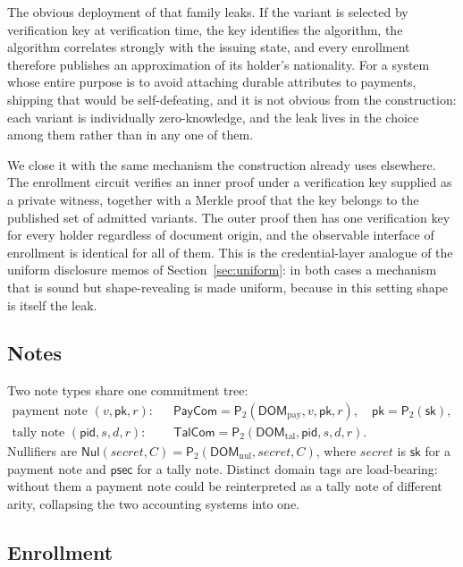 \documentclass[11pt,a4paper]{article}
\theoremstyle{definition}
\theoremstyle{plain}
\theoremstyle{remark}
\newcommand{\pid}{\ensuremath{\mathsf{pid}}}
\newcommand{\psec}{\ensuremath{\mathsf{psec}}}
\newcommand{\Pcom}{\ensuremath{\mathsf{PayCom}}}
\newcommand{\Tcom}{\ensuremath{\mathsf{TalCom}}}
\newcommand{\Nul}{\ensuremath{\mathsf{Nul}}}
\newcommand{\PT}{\ensuremath{\mathsf{P}_2}}
\begin{document}
The obvious deployment of that family leaks. If the variant is selected by verification key at verification time, the key identifies the algorithm, the algorithm correlates strongly with the issuing state, and every enrollment therefore publishes an approximation of its holder's nationality. For a system whose entire purpose is to avoid attaching durable attributes to payments, shipping that would be self-defeating, and it is not obvious from the construction: each variant is individually zero-knowledge, and the leak lives in the choice among them rather than in any one of them.

We close it with the same mechanism the construction already uses elsewhere. The enrollment circuit verifies an inner proof under a verification key supplied as a private witness, together with a Merkle proof that the key belongs to the published set of admitted variants. The outer proof then has one verification key for every holder regardless of document origin, and the observable interface of enrollment is identical for all of them. This is the credential-layer analogue of the uniform disclosure memos of Section~\ref{sec:uniform}: in both cases a mechanism that is sound but shape-revealing is made uniform, because in this setting shape is itself the leak.

\subsection{Notes}
\label{sec:notes}

Two note types share one commitment tree:
\begin{align*}
\text{payment note } (v, \mathsf{pk}, r): &\quad \Pcom = \PT(\mathsf{DOM}_{\mathrm{pay}}, v, \mathsf{pk}, r), \quad \mathsf{pk} = \PT(\mathsf{sk}),\\
\text{tally note } (\pid, s, d, r): &\quad \Tcom = \PT(\mathsf{DOM}_{\mathrm{tal}}, \pid, s, d, r).
\end{align*}
Nullifiers are $\Nul(\mathit{secret}, C) = \PT(\mathsf{DOM}_{\mathrm{nul}}, \mathit{secret}, C)$, where $\mathit{secret}$ is $\mathsf{sk}$ for a payment note and $\psec$ for a tally note. Distinct domain tags are load-bearing: without them a payment note could be reinterpreted as a tally note of different arity, collapsing the two accounting systems into one.

\subsection{Enrollment}
\label{sec:enroll}
\end{document}
